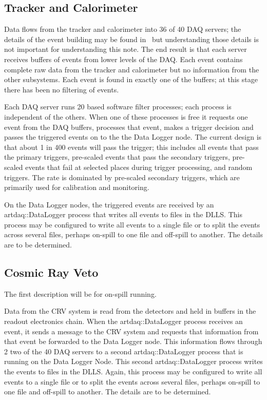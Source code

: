 \subsection{Tracker and Calorimeter}
\label{ssec:TrkAndCal}

Data flows from the tracker and calorimeter into 36 of 40 DAQ servers;
the details of the event building may be found in~
but understanding those details is not important for understanding this note.
The end result is that each server receives buffers of events from lower
levels of the DAQ.  Each event contains complete raw data from
the tracker and calorimeter but no information from the other subsystems.
Each event is found in exactly one of the buffers; at this stage there has been
no filtering of events.

Each DAQ server runs 20 \art based software filter processes; each process
is independent of the others.
When one of these processes is free it requests one event
from the DAQ buffers, processes that event, makes a trigger
decision and passes the triggered events on to the the Data Logger node.
The current design is that about 1 in 400 events will pass the trigger;
this includes all events that pass the primary triggers,
pre-scaled events that pass the secondary triggers,
pre-scaled events that fail at selected places during trigger processing,
and random triggers.
The rate is dominated by pre-scaled secondary triggers,
which are primarily used for calibration and monitoring.


On the Data Logger nodes, the triggered events are received by an {\code artdaq::DataLogger}
process that writes all events to files in the DLLS.
This process may be configured to write all events to a single file
or to split the events across several files,
perhaps on-spill to one file and off-spill to another.
The details are to be determined.



\subsection{Cosmic Ray Veto}
\label{ssec:CRV}

The first description will be for on-spill running.

Data from the CRV system is read from the detectors and held in buffers in the
readout electronics chain. 
When the {\code artdaq::DataLogger} process receives an event, it sends a message
to the CRV system and requests that information from that event be forwarded to
the Data Logger node.  This information flows through 2 two of the 40 DAQ servers
to a second {\code artdaq::DataLogger} process that is running on the Data Logger Node.
This second {\code artdaq::DataLogger} process writes the events to files in the DLLS.
Again, this process may be configured to write all events to a single file
or to split the events across several files,
perhaps on-spill to one file and off-spill to another.
The details are to be determined.

